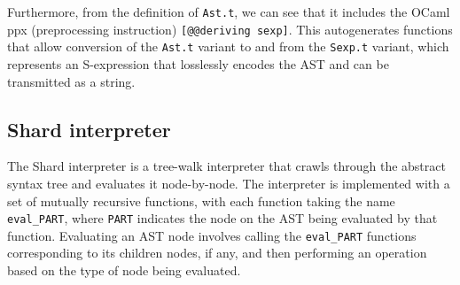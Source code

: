 \documentclass[twoside]{report}
\begin{document}
Furthermore, from the definition of \texttt{Ast.t}, we can see that it includes the OCaml ppx (preprocessing instruction) \texttt{[@@deriving sexp]}. This autogenerates functions that allow conversion of the \texttt{Ast.t} variant to and from the \texttt{Sexp.t} variant, which represents an S-expression that losslessly encodes the AST and can be transmitted as a string.

\subsection{Shard interpreter}

The Shard interpreter is a tree-walk interpreter that crawls through the abstract syntax tree and evaluates it node-by-node.
The interpreter is implemented with a set of mutually recursive functions, with each function taking the name \texttt{eval\_PART}, where \texttt{PART} indicates the node on the AST being evaluated by that function.
Evaluating an AST node involves calling the \texttt{eval\_PART} functions corresponding to its children nodes, if any, and then performing an operation based on the type of node being evaluated.







\end{document}
